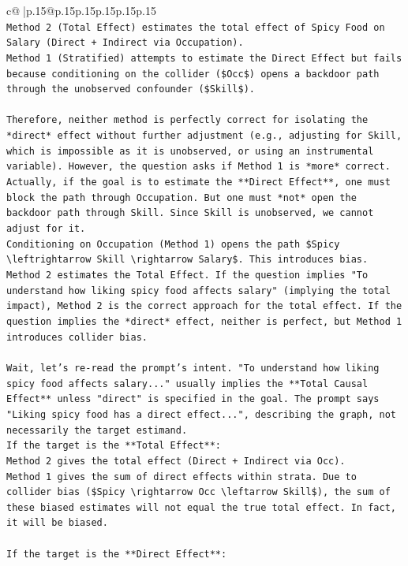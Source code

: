 \documentclass{article}
\begin{document}
{\begin{supertabular}{c@{$\;$}|p{.15\linewidth}@{}p{.15\linewidth}p{.15\linewidth}p{.15\linewidth}p{.15\linewidth}p{.15\linewidth}}
{{{\\ 
\texttt{Method 2 (Total Effect) estimates the total effect of Spicy Food on Salary (Direct + Indirect via Occupation).} \\
\texttt{Method 1 (Stratified) attempts to estimate the Direct Effect but fails because conditioning on the collider (\$Occ\$) opens a backdoor path through the unobserved confounder (\$Skill\$).} \\
\\ 
\texttt{Therefore, neither method is perfectly correct for isolating the *direct* effect without further adjustment (e.g., adjusting for Skill, which is impossible as it is unobserved, or using an instrumental variable). However, the question asks if Method 1 is *more* correct.} \\
\texttt{Actually, if the goal is to estimate the **Direct Effect**, one must block the path through Occupation. But one must *not* open the backdoor path through Skill. Since Skill is unobserved, we cannot adjust for it.} \\
\texttt{Conditioning on Occupation (Method 1) opens the path \$Spicy \textbackslash{}leftrightarrow Skill \textbackslash{}rightarrow Salary\$. This introduces bias.} \\
\texttt{Method 2 estimates the Total Effect. If the question implies "To understand how liking spicy food affects salary" (implying the total impact), Method 2 is the correct approach for the total effect. If the question implies the *direct* effect, neither is perfect, but Method 1 introduces collider bias.} \\
\\ 
\texttt{Wait, let's re{-}read the prompt's intent. "To understand how liking spicy food affects salary..." usually implies the **Total Causal Effect** unless "direct" is specified in the goal. The prompt says "Liking spicy food has a direct effect...", describing the graph, not necessarily the target estimand.} \\
\texttt{If the target is the **Total Effect**:} \\
\texttt{Method 2 gives the total effect (Direct + Indirect via Occ).} \\
\texttt{Method 1 gives the sum of direct effects within strata. Due to collider bias (\$Spicy \textbackslash{}rightarrow Occ \textbackslash{}leftarrow Skill\$), the sum of these biased estimates will not equal the true total effect. In fact, it will be biased.} \\
\\ 
\texttt{If the target is the **Direct Effect**:} \\
}}}
\end{supertabular}}
\end{document}
